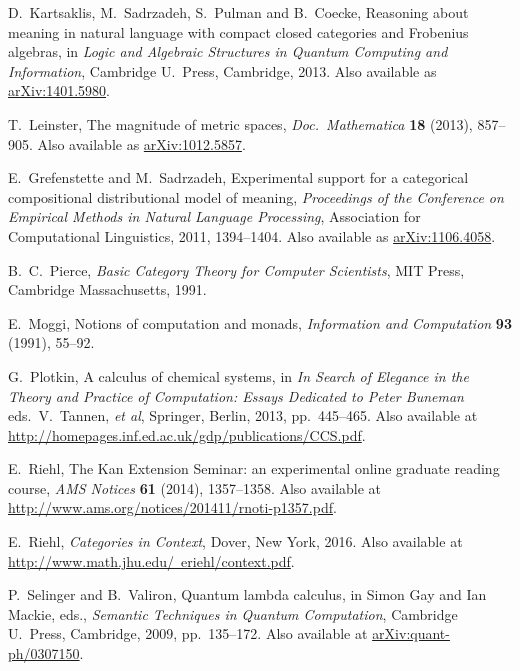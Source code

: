\documentclass[12pt]{amsart}
\begin{document}
\begin{thebibliography}{10}
  D.\ Kartsaklis, M.\ Sadrzadeh, S.\ Pulman and B.\ Coecke, Reasoning about meaning in natural language with compact closed categories and Frobenius algebras, in \textsl{Logic and Algebraic Structures in Quantum Computing and Information}, Cambridge U.\ Press, Cambridge, 2013.   Also available as \href{https://arxiv.org/abs/1401.5980}{arXiv:1401.5980}.

 T.\ Leinster, The magnitude of metric spaces, \textsl{Doc.\ Mathematica} \textbf{18} (2013), 857--905.   Also available as \href{https://arxiv.org/abs/1012.5857}{arXiv:1012.5857}.

 E.\ Grefenstette and M.\ Sadrzadeh, Experimental support for a categorical compositional distributional model of meaning, \textsl{Proceedings of the Conference on Empirical Methods in Natural Language Processing}, Association for Computational Linguistics, 2011, 1394--1404.   Also available as \href{https://arxiv.org/abs/1106.4058}{arXiv:1106.4058}.

 B.\ C.\ Pierce, \textsl{Basic Category Theory for Computer Scientists}, MIT Press, Cambridge Massachusetts, 1991.

  E.\ Moggi, Notions of computation and monads, \textsl{Information and Computation} \textbf{93} (1991), 55--92.

 G.\ Plotkin, A calculus of chemical systems, in \textsl{In Search of Elegance in the Theory and Practice of Computation: Essays Dedicated to Peter Buneman} eds.\ V.\ Tannen, 
\textit{et al}, Springer, Berlin, 2013, pp.\ 445--465.  Also available at \href{http://homepages.inf.ed.ac.uk/gdp/publications/CCS.pdf}{http://homepages.inf.ed.ac.uk/gdp/publications/CCS.pdf}.

 E.\ Riehl, The Kan Extension Seminar: an experimental online graduate reading course, \textsl{AMS Notices} \textbf{61} (2014), 1357--1358.  Also available at \href{http://www.ams.org/notices/201411/rnoti-p1357.pdf}{http://www.ams.org/notices/201411/rnoti-p1357.pdf}.

 E.\ Riehl, \textsl{Categories in Context},  Dover, New York, 2016.  Also available at \href{http://www.math.jhu.edu/~eriehl/context.pdf}{http://www.math.jhu.edu/~eriehl/context.pdf}.

 P.\ Selinger and B.\ Valiron, Quantum lambda calculus, 
in Simon Gay and Ian Mackie, eds., \textsl{Semantic Techniques in Quantum Computation}, Cambridge U.\ Press, Cambridge, 2009, pp.\ 135--172.  Also available at \href{https://arxiv.org/abs/quant-ph/0307150}{arXiv:quant-ph/0307150}.


\end{thebibliography}
\end{document}
